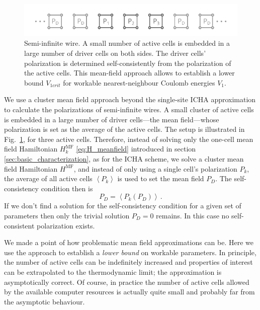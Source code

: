 \begin{figure}
  \center
  \includegraphics{semi_infinite_wire}
  \caption{
  Semi-infinite wire. A small number of active cells is embedded in a large
  number of driver cells on both sides. The driver cells' polarization is
  determined self-consistently from the polarization of the active cells. This
  mean-field approach allows to establish a lower bound $V_{1crit}$ for workable
  nearest-neighbour Coulomb energies $V_1$.
  }
  \label{fig:semi_infinite_wire}
\end{figure}

We use a cluster mean field approach beyond the single-site ICHA approximation
to calculate the polarizations of semi-infinite wires. A small cluster of active
cells is embedded in a large number of driver cells---the mean field---whose
polarization is set as the average of the active cells. The setup is illustrated
in Fig.~\ref{fig:semi_infinite_wire}, for three active cells. Therefore, instead
of solving only the one-cell mean field Hamiltonian $H^{\mathrm{MF}}_k$
\eqref{eq:H_meanfield} introduced in section \ref{sec:basic_characterization},
as for the ICHA scheme, we solve a cluster mean field Hamiltonian
$H^{\mathrm{MF}}$, and instead of only using a single cell's polarization $P_k$,
the average of all active cells $\left< P_k \right>$ is used to set the mean
field $P_D$. The self-consistency condition then is
%
\begin{equation}
  P_D = \left< P_k \left( P_D \right) \right> \, .
\end{equation}
%
If we don't find a solution for the self-consistency condition for a given set
of parameters then only the trivial solution $P_D = 0$ remains. In this case no
self-consistent polarization exists.

We made a point of how problematic mean field approximations can be. Here we use
the approach to establish a \emph{lower bound} on workable parameters. In
principle, the number of active cells can be indefinitely increased and
properties of interest can be extrapolated to the thermodynamic limit; the
approximation is asymptotically correct. Of course, in practice the number of
active cells allowed by the available computer resources is actually quite small
and probably far from the asymptotic behaviour.

